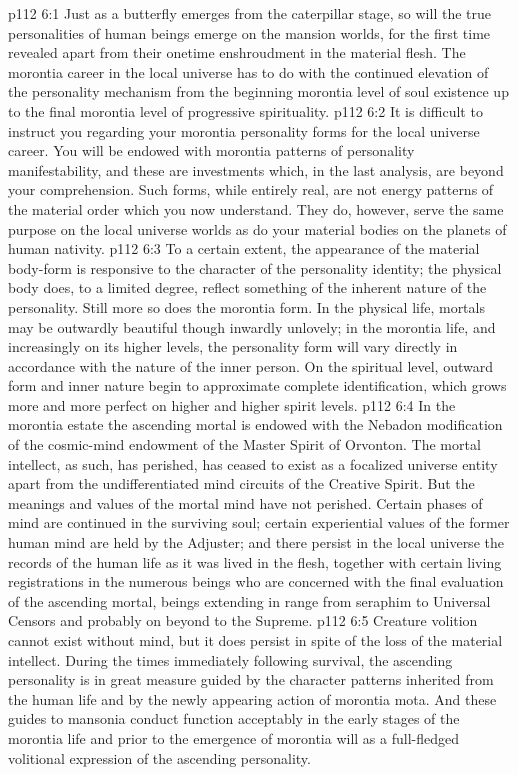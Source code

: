 \vs p112 6:1 Just as a butterfly emerges from the caterpillar stage, so will the true personalities of human beings emerge on the mansion worlds, for the first time revealed apart from their onetime enshroudment in the material flesh. The morontia career in the local universe has to do with the continued elevation of the personality mechanism from the beginning morontia level of soul existence up to the final morontia level of progressive spirituality.
\vs p112 6:2 It is difficult to instruct you regarding your morontia personality forms for the local universe career. You will be endowed with morontia patterns of personality manifestability, and these are investments which, in the last analysis, are beyond your comprehension. Such forms, while entirely real, are not energy patterns of the material order which you now understand. They do, however, serve the same purpose on the local universe worlds as do your material bodies on the planets of human nativity.
\vs p112 6:3 To a certain extent, the appearance of the material body\hyp{}form is responsive to the character of the personality identity; the physical body does, to a limited degree, reflect something of the inherent nature of the personality. Still more so does the morontia form. In the physical life, mortals may be outwardly beautiful though inwardly unlovely; in the morontia life, and increasingly on its higher levels, the personality form will vary directly in accordance with the nature of the inner person. On the spiritual level, outward form and inner nature begin to approximate complete identification, which grows more and more perfect on higher and higher spirit levels.
\vs p112 6:4 \pc In the morontia estate the ascending mortal is endowed with the Nebadon modification of the cosmic\hyp{}mind endowment of the Master Spirit of Orvonton. The mortal intellect, as such, has perished, has ceased to exist as a focalized universe entity apart from the undifferentiated mind circuits of the Creative Spirit. But the meanings and values of the mortal mind have not perished. Certain phases of mind are continued in the surviving soul; certain experiential values of the former human mind are held by the Adjuster; and there persist in the local universe the records of the human life as it was lived in the flesh, together with certain living registrations in the numerous beings who are concerned with the final evaluation of the ascending mortal, beings extending in range from seraphim to Universal Censors and probably on beyond to the Supreme.
\vs p112 6:5 Creature volition cannot exist without mind, but it does persist in spite of the loss of the material intellect. During the times immediately following survival, the ascending personality is in great measure guided by the character patterns inherited from the human life and by the newly appearing action of morontia mota. And these guides to mansonia conduct function acceptably in the early stages of the morontia life and prior to the emergence of morontia will as a full\hyp{}fledged volitional expression of the ascending personality.
